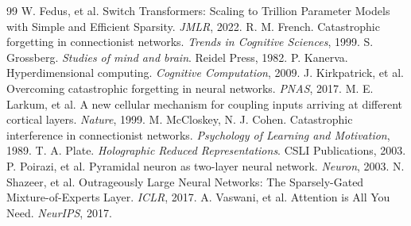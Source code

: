 \documentclass[10pt,twocolumn,letterpaper]{article}
\begin{document}
\begin{thebibliography}{99}
 W. Fedus, et al. Switch Transformers: Scaling to Trillion Parameter Models with Simple and Efficient Sparsity. \textit{JMLR}, 2022.
 R. M. French. Catastrophic forgetting in connectionist networks. \textit{Trends in Cognitive Sciences}, 1999.
 S. Grossberg. \textit{Studies of mind and brain}. Reidel Press, 1982.
 P. Kanerva. Hyperdimensional computing. \textit{Cognitive Computation}, 2009.
 J. Kirkpatrick, et al. Overcoming catastrophic forgetting in neural networks. \textit{PNAS}, 2017.
 M. E. Larkum, et al. A new cellular mechanism for coupling inputs arriving at different cortical layers. \textit{Nature}, 1999.
 M. McCloskey, N. J. Cohen. Catastrophic interference in connectionist networks. \textit{Psychology of Learning and Motivation}, 1989.
 T. A. Plate. \textit{Holographic Reduced Representations}. CSLI Publications, 2003.
 P. Poirazi, et al. Pyramidal neuron as two-layer neural network. \textit{Neuron}, 2003.
 N. Shazeer, et al. Outrageously Large Neural Networks: The Sparsely-Gated Mixture-of-Experts Layer. \textit{ICLR}, 2017.
 A. Vaswani, et al. Attention is All You Need. \textit{NeurIPS}, 2017.
\end{thebibliography}
\end{document}
